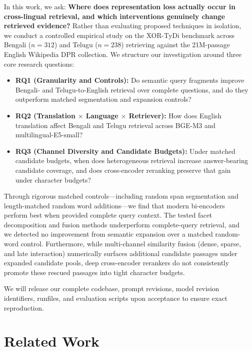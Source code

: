 \documentclass[11pt]{article}
\begin{document}
In this work, we ask: \textbf{Where does representation loss actually occur in cross-lingual retrieval, and which interventions genuinely change retrieved evidence?} Rather than evaluating proposed techniques in isolation, we conduct a controlled empirical study on the XOR-TyDi benchmark \citep{asai2021xor} across Bengali ($n=312$) and Telugu ($n=238$) retrieving against the 21M-passage English Wikipedia DPR collection. We structure our investigation around three core research questions:
\begin{itemize}
    \item \textbf{RQ1 (Granularity and Controls):} Do semantic query fragments improve Bengali- and Telugu-to-English retrieval over complete questions, and do they outperform matched segmentation and expansion controls?
    \item \textbf{RQ2 (Translation $\times$ Language $\times$ Retriever):} How does English translation affect Bengali and Telugu retrieval across BGE-M3 and multilingual-E5-small?
    \item \textbf{RQ3 (Channel Diversity and Candidate Budgets):} Under matched candidate budgets, when does heterogeneous retrieval increase answer-bearing candidate coverage, and does cross-encoder reranking preserve that gain under character budgets?
\end{itemize}

Through rigorous matched controls—including random span segmentation and length-matched random word additions—we find that modern bi-encoders perform best when provided complete query context. The tested facet decomposition and fusion methods underperform complete-query retrieval, and we detected no improvement from semantic expansion over a matched random-word control. Furthermore, while multi-channel similarity fusion (dense, sparse, and late interaction) numerically surfaces additional candidate passages under expanded candidate pools, deep cross-encoder rerankers do not consistently promote these rescued passages into tight character budgets.

We will release our complete codebase, prompt revisions, model revision identifiers, runfiles, and evaluation scripts upon acceptance to ensure exact reproduction.

\section{Related Work}
\label{sec:related}
\end{document}
